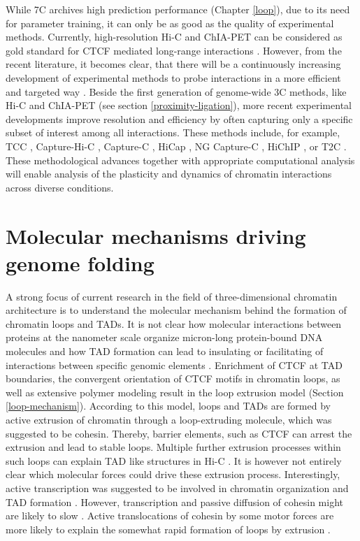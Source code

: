 \documentclass[a4paper,twoside=true,openright,parskip=full,chapterprefix=true,11pt,headings=normal,bibliography=totoc,listof=totoc,titlepage=on,captions=tableabove,draft=false]{scrreprt}
\theoremstyle{definition}
\theoremstyle{definition}
\theoremstyle{definition}
\theoremstyle{remark}
\begin{document}
While 7C archives high prediction performance (Chapter \ref{loop}), due
to its need for parameter training, it can only be as good as the
quality of experimental methods. Currently, high-resolution Hi-C and
ChIA-PET can be considered as gold standard for CTCF mediated long-range
interactions \citep{Rao2014, Tang2015}. However, from the recent
literature, it becomes clear, that there will be a continuously
increasing development of experimental methods to probe interactions in
a more efficient and targeted way
\citep{Denker2016, Schmitt2016, Davies2017}. Beside the first generation
of genome-wide 3C methods, like Hi-C and ChIA-PET (see section
\ref{proximity-ligation}), more recent experimental developments improve
resolution and efficiency by often capturing only a specific subset of
interest among all interactions. These methods include, for example, TCC
\citep{Kalhor2011}, Capture-Hi-C \citep{Dryden2014}, Capture-C
\citep{Hughes2014}, HiCap \citep{Sahlen2015}, NG Capture-C
\citep{Davies2016}, HiChIP \citep{Mumbach2016}, or T2C
\citep{Kolovos2018}. These methodological advances together with
appropriate computational analysis will enable analysis of the
plasticity and dynamics of chromatin interactions across diverse
conditions.

\hypertarget{molecular-mechanisms-driving-genome-folding}{%
\section{Molecular mechanisms driving genome
folding}\label{molecular-mechanisms-driving-genome-folding}}

A strong focus of current research in the field of three-dimensional
chromatin architecture is to understand the molecular mechanism behind
the formation of chromatin loops and TADs. It is not clear how molecular
interactions between proteins at the nanometer scale organize
micron-long protein-bound DNA molecules and how TAD formation can lead
to insulating or facilitating of interactions between specific genomic
elements \citep{Fudenberg2018}. Enrichment of CTCF at TAD boundaries,
the convergent orientation of CTCF motifs in chromatin loops, as well as
extensive polymer modeling result in the loop extrusion model (Section
\ref{loop-mechanism}). According to this model, loops and TADs are
formed by active extrusion of chromatin through a loop-extruding
molecule, which was suggested to be cohesin. Thereby, barrier elements,
such as CTCF can arrest the extrusion and lead to stable loops. Multiple
further extrusion processes within such loops can explain TAD like
structures in Hi-C \citep{Fudenberg2016}. It is however not entirely
clear which molecular forces could drive these extrusion process.
Interestingly, active transcription was suggested to be involved in
chromatin organization and TAD formation
\citep{Ulianov2015, Rowley2017}. However, transcription and passive
diffusion of cohesin might are likely to slow \citep{Barrington2017}.
Active translocations of cohesin by some motor forces are more likely to
explain the somewhat rapid formation of loops by extrusion
\citep{Rao2017}.
\end{document}
